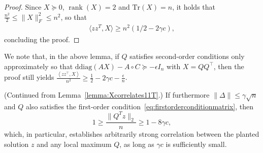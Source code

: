\documentclass{colt2016} %
\newcommand{\transpose}{^\top\! }
\newcommand{\inner}[2]{\left\langle{#1},{#2}\right\rangle}
\newcommand{\trace}{\mathrm{Tr}}
\newcommand{\rank}{\operatorname{rank}}
\newcommand{\1}{\mathbf{1}}
\newcommand{\ddiag}{\mathrm{ddiag}}
\begin{document}
\begin{proof}
	Since $X \succeq 0$, $\rank(X) = 2$ and $\trace(X) = n$, it holds that $ \frac{n^2}{2} \leq \|X\|_F^2 \leq n^2$, so that 
	\begin{align*}
	\langle zz^T, X \rangle \geq n^2(1/2 - 2\gamma c),
	\end{align*}
	concluding the proof.
\end{proof}
We note that, in the above lemma, if $Q$ satisfies second-order conditions only approximately so that $\ddiag(AX) - A\circ C \succeq -\epsilon I_n$ with $X=QQ\transpose$, then the proof still yields $\frac{\inner{zz\transpose}{X}}{n^2} \geq \frac{1}{2} - 2\gamma c - \frac{\epsilon}{n}$.
\begin{lemma}\label{lemma:Qcorrelates1}
	(Continued from Lemma~\ref{lemma:Xcorrelates11T}.) If furthermore $\|\Delta\|\leq \gamma\sqrt{n}$ and $Q$ also satisfies the first-order condition~\eqref{eq:firstorderconditionmatrix}, then
	\[
	1 \geq \frac{\| Q^Tz \|_2}{n} \geq 1 - 8\gamma c,
	\]
	which, in particular, establishes arbitrarily strong correlation between the planted solution $z$ and any local maximum $Q$, as long as $\gamma c$ is sufficiently small.
\end{lemma}
\end{document}
